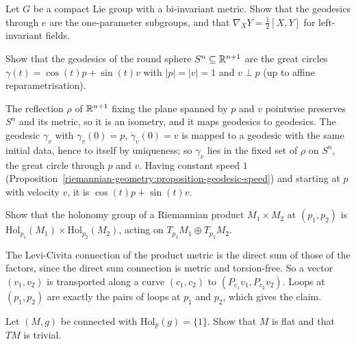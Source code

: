 \begin{exercise}\label{riemannian-geometry:exercise-bi-invariant}
Let $G$ be a compact Lie group with a bi-invariant metric. Show that the geodesics through $e$ are the one-parameter subgroups, and that $\nabla_XY = \frac12[X, Y]$ for left-invariant fields.
\end{exercise}
\begin{exercise}\label{riemannian-geometry:exercise-great-circles}
Show that the geodesics of the round sphere $S^n \subseteq \mathbb{R}^{n+1}$ are the great circles $\gamma(t) = \cos(t)p + \sin(t)v$ with $|p| = |v| = 1$ and $v \perp p$ (up to affine reparametrisation).
\end{exercise}

\begin{solution}
The reflection $\rho$ of $\mathbb{R}^{n+1}$ fixing the plane spanned by $p$ and $v$ pointwise preserves $S^n$ and its metric, so it is an isometry, and it maps geodesics to geodesics. The geodesic $\gamma_v$ with $\gamma_v(0) = p$, $\dot\gamma_v(0) = v$
is mapped to a geodesic with the same initial data, hence to itself by uniqueness; so $\gamma_v$ lies in the fixed set of $\rho$ on $S^n$, the great circle through $p$ and $v$. Having constant speed $1$
(Proposition~\ref{riemannian-geometry:proposition-geodesic-speed}) and starting at $p$ with velocity $v$, it is $\cos(t)p + \sin(t)v$.
\end{solution}

\begin{exercise}\label{riemannian-geometry:exercise-holonomy-product}
Show that the holonomy group of a Riemannian product $M_1 \times M_2$ at $(p_1, p_2)$ is $\mathrm{Hol}_{p_1}(M_1) \times \mathrm{Hol}_{p_2}(M_2)$, acting on $T_{p_1}M_1 \oplus T_{p_2}M_2$.
\end{exercise}

\begin{solution}
The Levi-Civita connection of the product metric is the direct sum of those of the factors, since the direct sum connection is metric and torsion-free. So a vector $(v_1, v_2)$ is transported along a curve $(c_1, c_2)$ to
$(P_{c_1}v_1, P_{c_2}v_2)$. Loops at $(p_1, p_2)$ are exactly the pairs of loops at $p_1$ and $p_2$, which gives the claim.
\end{solution}

\begin{exercise}\label{riemannian-geometry:exercise-trivial-holonomy}
Let $(M, g)$ be connected with $\mathrm{Hol}_p(g) = \{1\}$. Show that $M$ is flat and that $TM$ is trivial.
\end{exercise}

